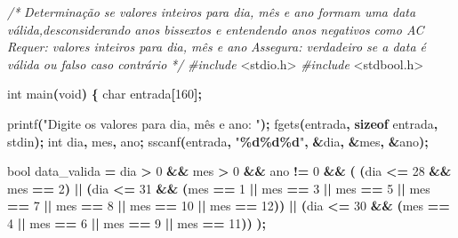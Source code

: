 \documentclass[
  11pt,
  a4paper,
]{scrbook}
\newenvironment{Shaded}{\begin{snugshade}}{\end{snugshade}}
\newcommand{\CommentTok}[1]{\textcolor[rgb]{0.56,0.35,0.01}{\textit{#1}}}
\newcommand{\DataTypeTok}[1]{\textcolor[rgb]{0.13,0.29,0.53}{#1}}
\newcommand{\DecValTok}[1]{\textcolor[rgb]{0.00,0.00,0.81}{#1}}
\newcommand{\ImportTok}[1]{#1}
\newcommand{\KeywordTok}[1]{\textcolor[rgb]{0.13,0.29,0.53}{\textbf{#1}}}
\newcommand{\NormalTok}[1]{#1}
\newcommand{\OperatorTok}[1]{\textcolor[rgb]{0.81,0.36,0.00}{\textbf{#1}}}
\newcommand{\PreprocessorTok}[1]{\textcolor[rgb]{0.56,0.35,0.01}{\textit{#1}}}
\newcommand{\SpecialCharTok}[1]{\textcolor[rgb]{0.81,0.36,0.00}{\textbf{#1}}}
\newcommand{\StringTok}[1]{\textcolor[rgb]{0.31,0.60,0.02}{#1}}
\begin{document}
\begin{Shaded}
\begin{Highlighting}[]
\CommentTok{/*}
\CommentTok{Determinação se valores inteiros para dia, mês e ano formam uma data}
\CommentTok{    válida,desconsiderando anos bissextos e entendendo anos negativos}
\CommentTok{    como AC}
\CommentTok{Requer: valores inteiros para dia, mês e ano}
\CommentTok{Assegura: verdadeiro se a data é válida ou falso caso contrário}
\CommentTok{*/}
\PreprocessorTok{\#include }\ImportTok{\textless{}stdio.h\textgreater{}}
\PreprocessorTok{\#include }\ImportTok{\textless{}stdbool.h\textgreater{}}

\DataTypeTok{int}\NormalTok{ main}\OperatorTok{(}\DataTypeTok{void}\OperatorTok{)} \OperatorTok{\{}
    \DataTypeTok{char}\NormalTok{ entrada}\OperatorTok{[}\DecValTok{160}\OperatorTok{];}
    
\NormalTok{    printf}\OperatorTok{(}\StringTok{"Digite os valores para dia, mês e ano: "}\OperatorTok{);}
\NormalTok{    fgets}\OperatorTok{(}\NormalTok{entrada}\OperatorTok{,} \KeywordTok{sizeof}\NormalTok{ entrada}\OperatorTok{,}\NormalTok{ stdin}\OperatorTok{);}
    \DataTypeTok{int}\NormalTok{ dia}\OperatorTok{,}\NormalTok{ mes}\OperatorTok{,}\NormalTok{ ano}\OperatorTok{;}
\NormalTok{    sscanf}\OperatorTok{(}\NormalTok{entrada}\OperatorTok{,} \StringTok{"}\SpecialCharTok{\%d\%d\%d}\StringTok{"}\OperatorTok{,} \OperatorTok{\&}\NormalTok{dia}\OperatorTok{,} \OperatorTok{\&}\NormalTok{mes}\OperatorTok{,} \OperatorTok{\&}\NormalTok{ano}\OperatorTok{);}

    \DataTypeTok{bool}\NormalTok{ data\_valida }\OperatorTok{=}\NormalTok{ dia }\OperatorTok{\textgreater{}} \DecValTok{0} \OperatorTok{\&\&}\NormalTok{ mes }\OperatorTok{\textgreater{}} \DecValTok{0} \OperatorTok{\&\&}\NormalTok{ ano }\OperatorTok{!=} \DecValTok{0} \OperatorTok{\&\&} \OperatorTok{(}
            \OperatorTok{(}\NormalTok{dia }\OperatorTok{\textless{}=} \DecValTok{28} \OperatorTok{\&\&}\NormalTok{ mes }\OperatorTok{==} \DecValTok{2}\OperatorTok{)} \OperatorTok{||}
            \OperatorTok{(}\NormalTok{dia }\OperatorTok{\textless{}=} \DecValTok{31} \OperatorTok{\&\&} \OperatorTok{(}\NormalTok{mes }\OperatorTok{==} \DecValTok{1} \OperatorTok{||}\NormalTok{ mes }\OperatorTok{==} \DecValTok{3} \OperatorTok{||}\NormalTok{ mes }\OperatorTok{==} \DecValTok{5} \OperatorTok{||}\NormalTok{ mes }\OperatorTok{==} \DecValTok{7} \OperatorTok{||}
\NormalTok{                mes }\OperatorTok{==} \DecValTok{8} \OperatorTok{||}\NormalTok{ mes }\OperatorTok{==} \DecValTok{10} \OperatorTok{||}\NormalTok{ mes }\OperatorTok{==} \DecValTok{12}\OperatorTok{))} \OperatorTok{||}
            \OperatorTok{(}\NormalTok{dia }\OperatorTok{\textless{}=} \DecValTok{30} \OperatorTok{\&\&} \OperatorTok{(}\NormalTok{mes }\OperatorTok{==} \DecValTok{4} \OperatorTok{||}\NormalTok{ mes }\OperatorTok{==} \DecValTok{6} \OperatorTok{||}\NormalTok{ mes }\OperatorTok{==} \DecValTok{9} \OperatorTok{||}\NormalTok{ mes }\OperatorTok{==} \DecValTok{11}\OperatorTok{))}
        \OperatorTok{);}


\end{Highlighting}
\end{Shaded}
\end{document}
